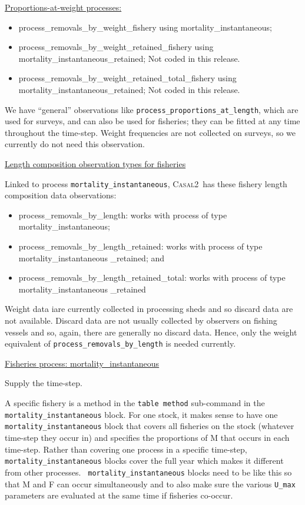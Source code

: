 \documentclass[a4paper,11pt,twoside,pdftex,draft]{article}
\newcommand{\CNAME}{\textsc{Casal2}}
\begin{document}
\bigskip
\underline{Proportions-at-weight processes:}

\begin{itemize}
	\item process\_removals\_by\_weight\_fishery using mortality\_instantaneous;
	\item process\_removals\_by\_weight\_retained\_fishery using mortality\_instantaneous\_retained; Not coded in this release.
	\item process\_removals\_by\_weight\_retained\_total\_fishery using mortality\_instantaneous\_retained;  Not coded in this release.
\end{itemize}


We have ``general'' observations like \texttt{process\_proportions\_at\_length}, which are used for surveys, and can also be used for fisheries; they can be fitted at any time throughout the time-step. Weight frequencies are not collected on surveys, so we currently do not need this observation.

\bigskip
\underline{Length composition observation types for fisheries}

Linked to process \texttt{mortality\_instantaneous}, \CNAME~has these fishery length composition data observations:

\begin{itemize}
	\item process\_removals\_by\_length: works with process of type mortality\_instantaneous;
	\item process\_removals\_by\_length\_retained: works with process of type mortality\_instantaneous \_retained; and
	\item process\_removals\_by\_length\_retained\_total: works with process of type mortality\_instantaneous \_retained
\end{itemize}

Weight data iare currently collected in processing sheds and so discard data are not available. Discard data are not usually collected by observers on fishing vessels and so, again, there are generally no discard data. Hence, only the weight equivalent of \texttt{process\_removals\_by\_length} is needed currently.


\bigskip
\underline{Fisheries process: mortality\_instantaneous}

Supply the time-step.

A specific fishery is a method in the \texttt{table method} sub-command in the   \texttt{mortality\_instantaneous} block. For one stock, it makes sense to have one \texttt{mortality\_instantaneous} block that covers all fisheries on the stock (whatever time-step they occur in) and specifies the proportions of M that occurs in each time-step. Rather than covering one process in a specific time-step, \texttt{mortality\_instantaneous} blocks cover the full year which makes it different from other processes. \texttt{ mortality\_instantaneous} blocks need to be like this so that M and F can occur simultaneously and to also make sure the various \texttt{U\_max} parameters are evaluated at the same time if fisheries co-occur.
\end{document}
